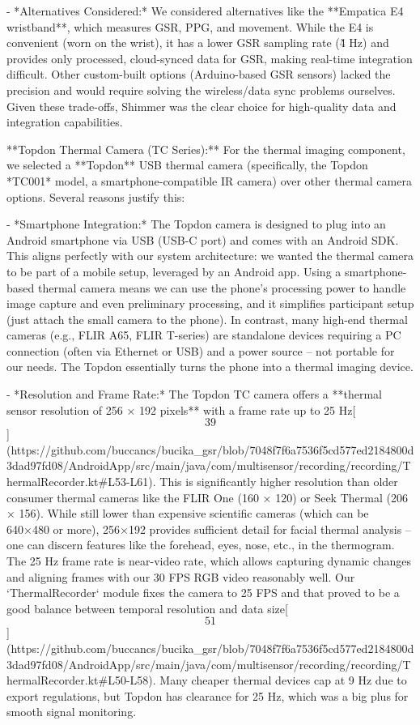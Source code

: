 \documentclass[12pt,a4paper]{article}
\begin{document}
- *Alternatives Considered:* We considered alternatives like the
  **Empatica E4 wristband**, which measures GSR, PPG, and movement.
  While the E4 is convenient (worn on the wrist), it has a lower GSR
  sampling rate (\~4 Hz) and provides only processed, cloud-synced data
  for GSR, making real-time integration difficult. Other custom-built
  options (Arduino-based GSR sensors) lacked the precision and would
  require solving the wireless/data sync problems ourselves. Given these
  trade-offs, Shimmer was the clear choice for high-quality data and
  integration capabilities.

**Topdon Thermal Camera (TC Series):** For the thermal imaging
component, we selected a **Topdon** USB thermal camera (specifically,
the Topdon *TC001* model, a smartphone-compatible IR camera) over other
thermal camera options. Several reasons justify this:

- *Smartphone Integration:* The Topdon camera is designed to plug into
  an Android smartphone via USB (USB-C port) and comes with an Android
  SDK. This aligns perfectly with our system architecture: we wanted the
  thermal camera to be part of a mobile setup, leveraged by an Android
  app. Using a smartphone-based thermal camera means we can use the
  phone's processing power to handle image capture and even preliminary
  processing, and it simplifies participant setup (just attach the small
  camera to the phone). In contrast, many high-end thermal cameras
  (e.g., FLIR A65, FLIR T-series) are standalone devices requiring a PC
  connection (often via Ethernet or USB) and a power source -- not
  portable for our needs. The Topdon essentially turns the phone into a
  thermal imaging device.

- *Resolution and Frame Rate:* The Topdon TC camera offers a **thermal
  sensor resolution of 256 × 192 pixels** with a frame rate up to 25
  Hz[\[39\]](https://github.com/buccancs/bucika_gsr/blob/7048f7f6a7536f5cd577ed2184800d3dad97fd08/AndroidApp/src/main/java/com/multisensor/recording/recording/ThermalRecorder.kt#L53-L61).
  This is significantly higher resolution than older consumer thermal
  cameras like the FLIR One (160 × 120) or Seek Thermal (206 × 156).
  While still lower than expensive scientific cameras (which can be
  640×480 or more), 256×192 provides sufficient detail for facial
  thermal analysis -- one can discern features like the forehead, eyes,
  nose, etc., in the thermogram. The 25 Hz frame rate is near-video
  rate, which allows capturing dynamic changes and aligning frames with
  our 30 FPS RGB video reasonably well. Our `ThermalRecorder` module
  fixes the camera to 25 FPS and that proved to be a good balance
  between temporal resolution and data
  size[\[51\]](https://github.com/buccancs/bucika_gsr/blob/7048f7f6a7536f5cd577ed2184800d3dad97fd08/AndroidApp/src/main/java/com/multisensor/recording/recording/ThermalRecorder.kt#L50-L58).
  Many cheaper thermal devices cap at 9 Hz due to export regulations,
  but Topdon has clearance for 25 Hz, which was a big plus for smooth
  signal monitoring.
\end{document}
